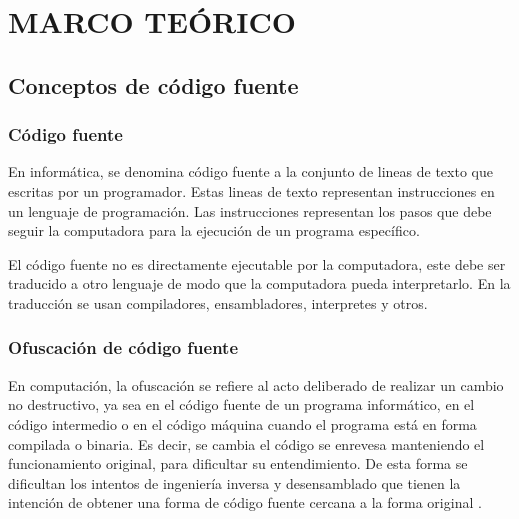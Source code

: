 \chapter{MARCO TEÓRICO}


\section{Conceptos de código fuente}
\subsection{Código fuente}
En informática, se denomina código fuente a la conjunto de lineas de texto que escritas por un programador. Estas lineas de texto representan instrucciones en un lenguaje de programación. Las instrucciones representan los pasos que debe seguir la computadora para la ejecución de un programa específico.

El código fuente no es directamente ejecutable por la computadora, este debe ser traducido a otro lenguaje de modo que la computadora pueda interpretarlo. En la traducción se usan compiladores, ensambladores, interpretes y otros.

\subsection{Ofuscación de código fuente}
En computación, la ofuscación se refiere al acto deliberado de realizar un cambio no destructivo, ya sea en el código fuente de un programa informático, en el código intermedio o en el código máquina cuando el programa está en forma compilada o binaria. Es decir, se cambia el código se enrevesa manteniendo el funcionamiento original, para dificultar su entendimiento. De esta forma se dificultan los intentos de ingeniería inversa y desensamblado que tienen la intención de obtener una forma de código fuente cercana a la forma original \cite{wiki:Obfuscation_(software)}.

